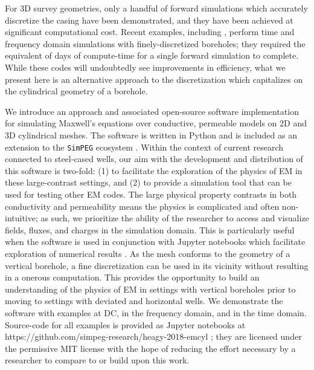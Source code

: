 \documentclass[preprint,review,3p,times,onecolumn,authoryear]{elsarticle}
\begin{document}
For 3D survey geometries, only a handful of forward simulations which accurately discretize the casing have been demonstrated, and they have been achieved at significant computational cost. Recent examples, including \cite{Commer2015, Um2015, Puzyrev2017}, perform time and frequency domain simulations with finely-discretized boreholes; they required the equivalent of days of compute-time for a single forward simulation to complete. While these codes will undoubtedly see improvements in efficiency, what we present here is an alternative approach to the discretization which capitalizes on the cylindrical geometry of a borehole.

We introduce an approach and associated open-source software implementation for simulating Maxwell's equations over conductive, permeable models on 2D and 3D cylindrical meshes. The software is written in Python \citep{van1995python} and is included as an extension to the \texttt{SimPEG} ecosystem \citep{Cockett2015, Heagy2017}. Within the context of current research connected to steel-cased wells, our aim with the development and distribution of this software is two-fold: (1) to facilitate the exploration of the physics of EM in these large-contrast settings, and (2) to provide a simulation tool that can be used for testing other EM codes. The large physical property contrasts in both conductivity and permeability means the physics is complicated and often non-intuitive; as such, we prioritize the ability of the researcher to access and visualize fields, fluxes, and charges in the simulation domain. This is particularly useful when the software is used in conjunction with Jupyter notebooks which facilitate exploration of numerical results \citep{Perez2015}. As the mesh conforms to the geometry of a vertical borehole, a fine discretization can be used in its vicinity without resulting in a onerous computation. This provides the opportunity to build an understanding of the physics of EM in settings with vertical boreholes prior to moving to settings with deviated and horizontal wells. We demonstrate the software with examples at DC, in the frequency domain, and in the time domain. Source-code for all examples is provided as Jupyter notebooks at https://github.com/simpeg-research/heagy-2018-emcyl \citep{Heagy2018}; they are licensed under the permissive MIT license with the hope of reducing the effort necessary by a researcher to compare to or build upon this work.
\end{document}
